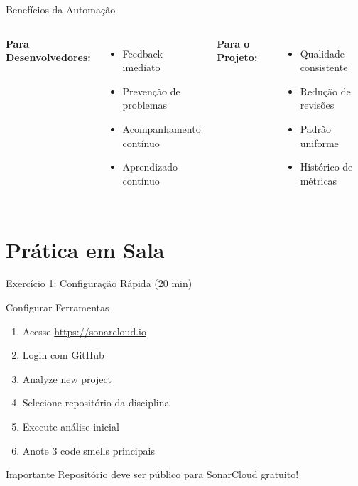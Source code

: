 \documentclass[aspectratio=169,11pt]{beamer}
\begin{document}
\begin{frame}{Benefícios da Automação}
\begin{columns}[T]
\textbf{Para Desenvolvedores:}
\begin{itemize}
    \item {} Feedback imediato
    \item {} Prevenção de problemas
    \item {} Acompanhamento contínuo
    \item {} Aprendizado contínuo
\end{itemize}

\textbf{Para o Projeto:}
\begin{itemize}
    \item {} Qualidade consistente
    \item {} Redução de revisões
    \item {} Padrão uniforme
    \item {} Histórico de métricas
\end{itemize}
\end{columns}
\end{frame}

\section{Prática em Sala}

\begin{frame}{Exercício 1: Configuração Rápida (20 min)}
\begin{block}{ Configurar Ferramentas}
\begin{enumerate}
    \item Acesse \url{https://sonarcloud.io}
    \item Login com GitHub
    \item Analyze new project
    \item Selecione repositório da disciplina
    \item Execute análise inicial
    \item Anote 3 code smells principais
\end{enumerate}
\end{block}

\begin{alertblock}{ Importante}
Repositório deve ser público para SonarCloud gratuito!
\end{alertblock}
\end{frame}
\end{document}
